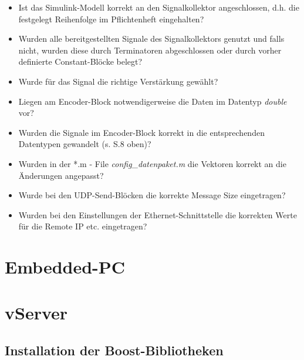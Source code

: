 \documentclass[fontsize = 12pt, paper = a4]{scrreprt}
\begin{document}
\begin{itemize}

\item Ist das Simulink-Modell korrekt an den Signalkollektor angeschlossen, d.h. die festgelegt Reihenfolge im Pflichtenheft eingehalten?

\item Wurden alle bereitgestellten Signale des Signalkollektors genutzt und falls nicht, wurden diese durch Terminatoren abgeschlossen oder durch vorher definierte Constant-Blöcke belegt?

\item Wurde für das Signal die richtige Verstärkung gewählt?

\item Liegen am Encoder-Block notwendigerweise die Daten im Datentyp \textit{double} vor?

\item Wurden die Signale im Encoder-Block korrekt in die entsprechenden Datentypen gewandelt (s. S.8 oben)?

\item Wurden in der *.m - File \textit{config\_datenpaket.m} die Vektoren korrekt an die Änderungen angepasst?

\item Wurde bei den UDP-Send-Blöcken die korrekte Message Size eingetragen?

\item Wurden bei den Einstellungen der Ethernet-Schnittstelle die korrekten Werte für die Remote IP etc. eingetragen?

\end{itemize}

\newpage


\section{Embedded-PC}


\section{vServer}


\subsection{Installation der Boost-Bibliotheken}
\end{document}
